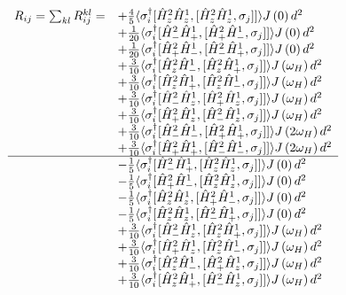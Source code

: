 \documentclass[notitlepage,11pt]{article}
\begin{document}
\begin{equation}
\begin{array}{rl}
  R_{ij}  = \sum_{kl} R_{ij}^{kl} =&+\frac{4}{5}\langle \sigma_i^\dagger [\hat{H}^2_z\hat{H}^1_z,[\hat{H}^2_z\hat{H}^1_z,\sigma_j]] \rangle J\left(0\right)d^2 \\
& +\frac{1}{20}\langle \sigma_i^\dagger [\hat{H}^2_- \hat{H}^1_+ ,[\hat{H}^2_+ \hat{H}^1_- ,\sigma_j]] \rangle J\left(0\right)d^2 \\
& +\frac{1}{20}\langle \sigma_i^\dagger [\hat{H}^2_+ \hat{H}^1_- ,[\hat{H}^2_- \hat{H}^1_+ ,\sigma_j]] \rangle J\left(0\right)d^2 \\
& +\frac{3}{10}\langle \sigma_i^\dagger [\hat{H}^2_z\hat{H}^1_- ,[\hat{H}^2_z\hat{H}^1_+ ,\sigma_j]] \rangle J\left(\omega_H\right)d^2\\ 
& +\frac{3}{10}\langle \sigma_i^\dagger [\hat{H}^2_z\hat{H}^1_+ ,[\hat{H}^2_z\hat{H}^1_- ,\sigma_j]] \rangle J\left(\omega_H\right)d^2 \\
& +\frac{3}{10}\langle \sigma_i^\dagger [\hat{H}^2_- \hat{H}^1_z,[\hat{H}^2_+ \hat{H}^1_z,\sigma_j]] \rangle J\left(\omega_H\right)d^2 \\
& +\frac{3}{10}\langle \sigma_i^\dagger [\hat{H}^2_+ \hat{H}^1_z,[\hat{H}^2_- \hat{H}^1_z,\sigma_j]] \rangle J\left(\omega_H\right)d^2 \\
& +\frac{3}{10}\langle \sigma_i^\dagger [\hat{H}^2_- \hat{H}^1_- ,[\hat{H}^2_+ \hat{H}^1_+ ,\sigma_j]] \rangle J\left(2\omega_H\right)d^2\\ 
& +\frac{3}{10}\langle \sigma_i^\dagger [\hat{H}^2_+ \hat{H}^1_+ ,[\hat{H}^2_- \hat{H}^1_- ,\sigma_j]] \rangle J\left(2\omega_H\right)d^2 \\
\hline
 &-\frac{1}{5}\langle \sigma_i^\dagger [\hat{H}^2_- \hat{H}^1_+ ,[\hat{H}^2_z\hat{H}^1_z,\sigma_j]] \rangle J\left(0\right)d^2  \\
& -\frac{1}{5}\langle \sigma_i^\dagger [\hat{H}^2_+ \hat{H}^1_- ,[\hat{H}^2_z\hat{H}^1_z,\sigma_j]] \rangle J\left(0\right)d^2 \\
& -\frac{1}{5}\langle \sigma_i^\dagger [\hat{H}^2_z\hat{H}^1_z,[\hat{H}^2_+ \hat{H}^1_- ,\sigma_j]] \rangle J\left(0\right)d^2 \\
& -\frac{1}{5}\langle \sigma_i^\dagger [\hat{H}^2_z\hat{H}^1_z,[\hat{H}^2_- \hat{H}^1_+ ,\sigma_j]] \rangle J\left(0\right)d^2 \\
& +\frac{3}{10}\langle \sigma_i^\dagger [\hat{H}^2_- \hat{H}^1_z,[\hat{H}^2_z\hat{H}^1_+ ,\sigma_j]] \rangle J\left(\omega_H\right)d^2\\ 
& +\frac{3}{10}\langle \sigma_i^\dagger [\hat{H}^2_+ \hat{H}^1_z,[\hat{H}^2_z\hat{H}^1_- ,\sigma_j]] \rangle J\left(\omega_H\right)d^2 \\
& +\frac{3}{10}\langle \sigma_i^\dagger [\hat{H}^2_z\hat{H}^1_- ,[\hat{H}^2_+ \hat{H}^1_z,\sigma_j]] \rangle J\left(\omega_H\right)d^2 \\
& +\frac{3}{10}\langle \sigma_i^\dagger [\hat{H}^2_z\hat{H}^1_+ ,[\hat{H}^2_- \hat{H}^1_z,\sigma_j]] \rangle J\left(\omega_H\right)d^2 
\end{array}
\end{equation}
\end{document}
